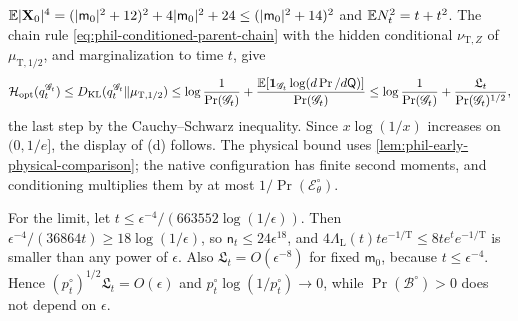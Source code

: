 \(\mathbb E|\mathbf X_0|^4=(|\mathsf m_0|^2+12)^2+4|\mathsf m_0|^2+24
\le(|\mathsf m_0|^2+14)^2\) and \(\mathbb E N_t^2=t+t^2\). The chain rule
\cref{eq:phil-conditioned-parent-chain} with the hidden conditional
\(\nu_{\mathrm T,Z}\) of \(\mu_{\mathrm T,1/2}\), and marginalization to time
\(t\), give
\[
 \mathcal H_{\mathrm{opt}}(q^{\mathscr G_t}_t)
 \le D_{\mathrm{KL}}(q^{\mathscr G_t}_t\Vert\mu_{\mathrm T,1/2})
 \le\log\frac1{\Pr(\mathscr G_t)}+
   \frac{\mathbb E[\mathbf 1_{\mathscr G_t}\log(d\Pr/d\mathsf Q)]}{\Pr(\mathscr G_t)}
 \le\log\frac1{\Pr(\mathscr G_t)}+\frac{\mathfrak L_t}{\Pr(\mathscr G_t)^{1/2}},
\]
the last step by the Cauchy--Schwarz inequality. Since \(x\log(1/x)\)
increases on \((0,1/e]\), the display of (d) follows. The physical bound uses
\cref{lem:phil-early-physical-comparison}; the native configuration has
finite second moments, and conditioning multiplies them by at most
\(1/\Pr(\mathscr E^\circ_\theta)\).

For the limit, let
\(t\le\epsilon^{-4}/(663552\log(1/\epsilon))\). Then
\(\epsilon^{-4}/(36864t)\ge18\log(1/\epsilon)\), so
\(\mathsf n_t\le24\epsilon^{18}\), and
\(4\Lambda_{\mathrm L}(t)te^{-1/\mathrm T}\le8te^te^{-1/\mathrm T}\) is
smaller than any power of \(\epsilon\). Also
\(\mathfrak L_t=O(\epsilon^{-8})\) for fixed \(\mathsf m_0\), because
\(t\le\epsilon^{-4}\). Hence \((p^\circ_t)^{1/2}\mathfrak L_t=O(\epsilon)\) and
\(p^\circ_t\log(1/p^\circ_t)\to0\), while \(\Pr(\mathscr B^\circ)>0\) does not
depend on \(\epsilon\).

